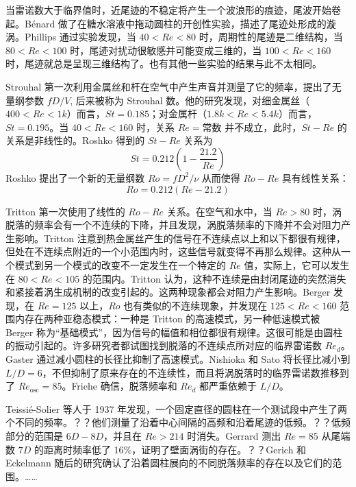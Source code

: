 当雷诺数大于临界值时，近尾迹的不稳定将产生一个波浪形的痕迹，尾波开始卷起。Bénard 做了在糖水溶液中拖动圆柱的开创性实验，描述了尾迹处形成的漩涡。Phillips \cite{} 通过实验发现，当 $40<Re<80$ 时，周期性的尾迹是二维结构，当 $80<Re<100$ 时，尾迹对扰动很敏感并可能变成三维的，当 $100<Re<160$ 时，尾迹就总是呈现三维结构了。也有其他一些实验的结果与此不太相同。


Strouhal 第一次利用金属丝和杆在空气中产生声音并测量了它的频率，提出了无量纲参数 $fD/V$, 后来被称为 Strouhal 数。他的研究发现，对细金属丝（$400<Re<1k$）而言，$St=0.185$；对金属杆（$1.8k<Re<5.4k$）而言，$St=0.195$。当 $40<Re<160$ 时，关系 $Re=\text{常数}$ 并不成立，此时，$St-Re$ 的关系是非线性的。Roshko \cite{Roshko1953} 得到的 $St-Re$ 关系为
\begin{equation}
	St = 0.212 (1-\frac{21.2}{Re})
\end{equation}
Roshko \cite{Roshko1953} 提出了一个新的无量纲数 $Ro=fD^2/\nu$ 从而使得 $Ro-Re$ 具有线性关系：
\begin{equation}
	Ro = 0.212 (Re - 21.2)
\end{equation}

Tritton 第一次使用了线性的 $Ro-Re$ 关系。在空气和水中，当 $Re>80$ 时，涡脱落的频率会有一个不连续的下降，并且发现，涡脱落频率的下降并不会对阻力产生影响。Tritton 注意到热金属丝产生的信号在不连续点以上和以下都很有规律，但处在不连续点附近的一个小范围内时，这些信号就变得不再那么规律。这种从一个模式到另一个模式的改变不一定发生在一个特定的 $Re$ 值，实际上，它可以发生在 $80<Re<105$ 的范围内。Tritton 认为，这种不连续是由封闭尾迹的突然消失和紧接着涡生成机制的改变引起的。这两种现象都会对阻力产生影响。Berger 发现，在 $Re=125$ 以上，$Ro$ 也有类似的不连续现象，并发现在 $125<Re<160$ 范围内存在两种亚稳态模式：一种是 Tritton 的高速模式，另一种低速模式被 Berger 称为“基础模式”，因为信号的幅值和相位都很有规律。这很可能是由圆柱的振动引起的。许多研究者都试图找到脱落的不连续点所对应的临界雷诺数 $Re_d$。Gaster 通过减小圆柱的长径比抑制了高速模式。Nishioka 和 Sato 将长径比减小到 $L/D=6$，不但抑制了原来存在的不连续性，而且将涡脱落时的临界雷诺数推移到了 $Re_\text{osc}=85$。Friehe 确信，脱落频率和 $Re_d$ 都严重依赖于 $L/D$。

Teissié-Solier 等人于 1937 年发现，一个固定直径的圆柱在一个测试段中产生了两个不同的频率。？？他们测量了沿着中心间隔的高频和沿着尾迹的低频。？？低频部分的范围是 $6D-8D$，并且在 $Re>214$ 时消失。Gerrard 测出 $Re=85$ 从尾端数 $7D$ 的距离时频率低了 16\%，证明了壁面涡街的存在。？？Gerich 和 Eckelmann 随后的研究确认了沿着圆柱展向的不同脱落频率的存在以及它们的范围。……


